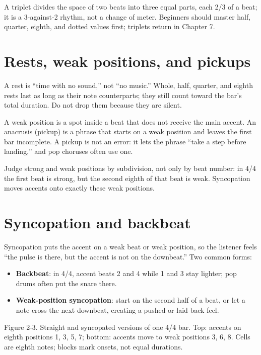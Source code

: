 A triplet divides the space of two beats into three equal parts, each 2/3 of a beat; it is a 3-against-2 rhythm, not a change of meter. Beginners should master half, quarter, eighth, and dotted values first; triplets return in Chapter 7.

\section{Rests, weak positions, and pickups}

A rest is ``time with no sound,'' not ``no music.'' Whole, half, quarter, and eighth rests last as long as their note counterparts; they still count toward the bar's total duration. Do not drop them because they are silent.

A weak position is a spot inside a beat that does not receive the main accent. An anacrusis (pickup) is a phrase that starts on a weak position and leaves the first bar incomplete. A pickup is not an error: it lets the phrase ``take a step before landing,'' and pop choruses often use one.

Judge strong and weak positions by subdivision, not only by beat number: in 4/4 the first beat is strong, but the second eighth of that beat is weak. Syncopation moves accents onto exactly these weak positions.

\section{Syncopation and backbeat}

Syncopation puts the accent on a weak beat or weak position, so the listener feels ``the pulse is there, but the accent is not on the downbeat.'' Two common forms:

\begin{itemize}
  \item \textbf{Backbeat}: in 4/4, accent beats 2 and 4 while 1 and 3 stay lighter; pop drums often put the snare there.
  \item \textbf{Weak-position syncopation}: start on the second half of a beat, or let a note cross the next downbeat, creating a pushed or laid-back feel.
\end{itemize}

\begin{center}

\small Figure 2-3. Straight and syncopated versions of one 4/4 bar. Top: accents on eighth positions 1, 3, 5, 7; bottom: accents move to weak positions 3, 6, 8. Cells are eighth notes; blocks mark onsets, not equal durations.
\end{center}

